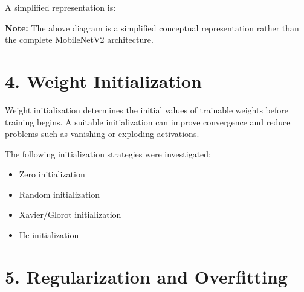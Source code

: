 \documentclass[10pt]{article}
\begin{document}
A simplified representation is:

\begin{center}
\end{center}

\textbf{Note:} The above diagram is a simplified conceptual representation
rather than the complete MobileNetV2 architecture.

\section*{4. Weight Initialization}

Weight initialization determines the initial values of trainable weights
before training begins. A suitable initialization can improve convergence
and reduce problems such as vanishing or exploding activations.

The following initialization strategies were investigated:

\begin{itemize}
\item Zero initialization
\item Random initialization
\item Xavier/Glorot initialization
\item He initialization
\end{itemize}

\section*{5. Regularization and Overfitting}
\end{document}
